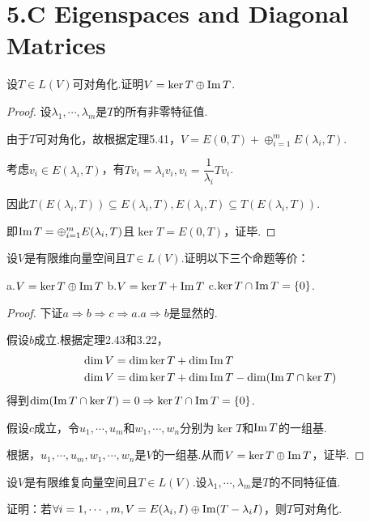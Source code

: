 \section{5.C Eigenspaces and Diagonal Matrices}

\begin{problem}[1]\label{5.C.1}
    设\(T \in L(V)\)可对角化.证明\(V=\ker T \oplus \operatorname{Im} T\).
\end{problem}

\begin{proof}
    设\(\lambda_1,\cdots,\lambda_m\)是\(T\)的所有非零特征值.

    由于\(T\)可对角化，故根据定理5.41，\(V=E(0,T)+\oplus_{i=1}^m E(\lambda_i,T)\).

    考虑\(v_i \in E(\lambda_i,T)\)，有\(Tv_i=\lambda_iv_i,v_i=\dfrac{1}{\lambda_i}Tv_i\).

    因此\(T(E(\lambda_i,T)) \subseteq E(\lambda_i,T),E(\lambda_i,T) \subseteq T(E(\lambda_i,T))\).

    即\(\operatorname{Im} T=\oplus_{i=1}^m E(\lambda_i,T)\)且\(\ker T=E(0,T)\)，证毕.
\end{proof}

\begin{problem}[3]\label{5.C.3}
    设\(V\)是有限维向量空间且\(T \in L(V)\).证明以下三个命题等价：

    a.\(V=\ker T \oplus \operatorname{Im} T\) \quad b.\(V=\ker T+\operatorname{Im} T\) \quad c.\(\ker T \cap \operatorname{Im} T=\{0\}\).
\end{problem}

\begin{proof}
    下证\(a \Rightarrow b \Rightarrow c \Rightarrow a\).\(a \Rightarrow b\)是显然的.

    假设\(b\)成立.根据定理2.43和3.22，
    \begin{align*}
        \dim V &= \dim \ker T+\dim \operatorname{Im} T \\
        \dim V &= \dim \ker T+\dim \operatorname{Im} T-\dim (\operatorname{Im} T \cap \ker T)
    \end{align*}
    得到\(\dim (\operatorname{Im} T \cap \ker T)=0 \Rightarrow \ker T \cap \operatorname{Im} T=\{0\}\).
    
    假设\(c\)成立，令\(u_1,\cdots,u_m\)和\(w_1,\cdots,w_n\)分别为\(\ker T\)和\(\operatorname{Im} T\)的一组基.
    
    根据，\(u_1,\cdots,u_m,w_1,\cdots,w_n\)是\(V\)的一组基.从而\(V=\ker T \oplus \operatorname{Im} T\)，证毕.
\end{proof}

\begin{problem}[5]\label{5.C.5}
    设\(V\)是有限维复向量空间且\(T \in L(V)\).设\(\lambda_1,\cdots,\lambda_m\)是\(T\)的不同特征值.

    证明：若\(\forall i=1,\cdots,m,V=E(\lambda_i,I) \oplus \operatorname{Im}(T-\lambda_i I)\)，则\(T\)可对角化.
\end{problem}

